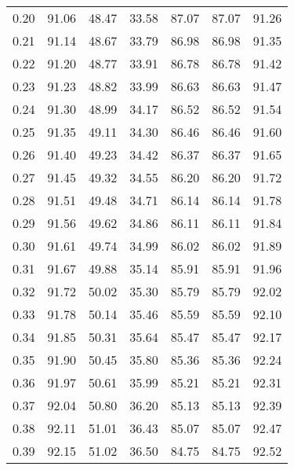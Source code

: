 \begin{tabular}{|c|c|c|c|c|c|c|}
      0.20 &     91.06 &     48.47 &      33.58 &   87.07 &      87.07 &         91.26 \\
      0.21 &     91.14 &     48.67 &      33.79 &   86.98 &      86.98 &         91.35 \\
      0.22 &     91.20 &     48.77 &      33.91 &   86.78 &      86.78 &         91.42 \\
      0.23 &     91.23 &     48.82 &      33.99 &   86.63 &      86.63 &         91.47 \\
      0.24 &     91.30 &     48.99 &      34.17 &   86.52 &      86.52 &         91.54 \\
      0.25 &     91.35 &     49.11 &      34.30 &   86.46 &      86.46 &         91.60 \\
      0.26 &     91.40 &     49.23 &      34.42 &   86.37 &      86.37 &         91.65 \\
      0.27 &     91.45 &     49.32 &      34.55 &   86.20 &      86.20 &         91.72 \\
      0.28 &     91.51 &     49.48 &      34.71 &   86.14 &      86.14 &         91.78 \\
      0.29 &     91.56 &     49.62 &      34.86 &   86.11 &      86.11 &         91.84 \\
      0.30 &     91.61 &     49.74 &      34.99 &   86.02 &      86.02 &         91.89 \\
      0.31 &     91.67 &     49.88 &      35.14 &   85.91 &      85.91 &         91.96 \\
      0.32 &     91.72 &     50.02 &      35.30 &   85.79 &      85.79 &         92.02 \\
      0.33 &     91.78 &     50.14 &      35.46 &   85.59 &      85.59 &         92.10 \\
      0.34 &     91.85 &     50.31 &      35.64 &   85.47 &      85.47 &         92.17 \\
      0.35 &     91.90 &     50.45 &      35.80 &   85.36 &      85.36 &         92.24 \\
      0.36 &     91.97 &     50.61 &      35.99 &   85.21 &      85.21 &         92.31 \\
      0.37 &     92.04 &     50.80 &      36.20 &   85.13 &      85.13 &         92.39 \\
      0.38 &     92.11 &     51.01 &      36.43 &   85.07 &      85.07 &         92.47 \\
      0.39 &     92.15 &     51.02 &      36.50 &   84.75 &      84.75 &         92.52 \\

\end{tabular}
